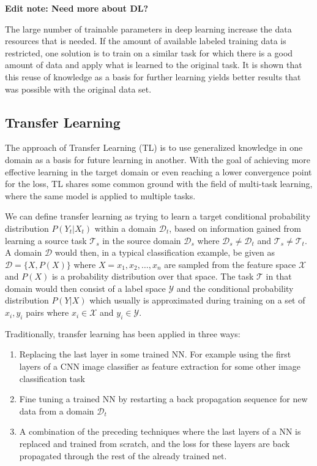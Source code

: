 \textbf{Edit note: Need more about DL?}

The large number of trainable parameters in deep learning increase the data resources that is needed. If the amount of available labeled training data is restricted, one solution is to train on a similar task for which there is a good amount of data and apply what is learned to the original task. It is shown that this reuse of knowledge as a basis for further learning yields better results that was possible with the original data set\cite{pathnet, progressiveneuralnetworks, tradaboost}. 

\subsection{Transfer Learning}
The approach of Transfer Learning (TL) is to use generalized knowledge in one domain as a basis for future learning in another. With the goal of achieving more effective learning in the target domain or even reaching a lower convergence point for the loss, TL shares some common ground with the field of multi-task learning, where the same model is applied to multiple tasks. 

We can define transfer learning as trying to learn a target conditional probability distribution \(P(Y_{t}|X_{t})\) within a domain \(\mathcal{D}_{t}\), based on information gained from learning a source task \(\mathcal{T}_{s}\) in the source domain \(\mathcal{D}_{s}\) where \(\mathcal{D}_{s} \neq \mathcal{D}_{t}\) and \(\mathcal{T}_{s} \neq \mathcal{T}_{t}\). A domain \(\mathcal{D}\) would then, in a typical classification example, be given as \(\mathcal{D} = \{X, P(X)\}\) where \(X = x_{1},x_{2}, \dotsc ,x_{n}\) are sampled from the feature space \(\mathcal{X}\) and \(P(X)\) is a probability distribution over that space. The task \(\mathcal{T}\) in that domain would then consist of a label space \(\mathcal{Y}\) and the conditional probability distribution \(P(Y|X)\) which usually is approximated during training on a set of \(x_{i}, y_{i}\) pairs where \(x_{i} \in \mathcal{X}\) and \(y_{i} \in \mathcal{Y}\).
\newline\newline

Traditionally, transfer learning has been applied in three ways: 
\begin{enumerate}  
    \item Replacing the last layer in some trained NN. For example using the first layers of a CNN image classifier as feature extraction for some other image classification task 
    \item Fine tuning a trained NN by restarting a back propagation sequence for new data from a domain \(\mathcal{D}_{t}\)
    \item A combination of the preceding techniques where the last layers of a NN is replaced and trained from scratch, and the loss for these layers are back propagated through the rest of the already trained net.
\end{enumerate}


